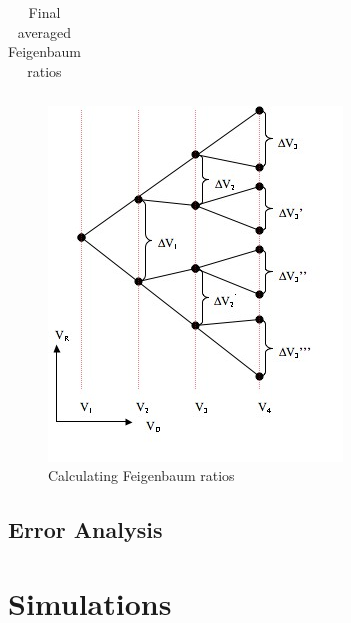 \documentclass[12pt]{report}
\begin{document}

	
	\begin{table}
		\centering
		\begin{tabular}{|c|c|c|c|c|}
			\hline
			 
		\end{tabular}
		\caption{Final averaged Feigenbaum ratios}
		\label{tab:fegeinbaum}
	\end{table}
	
	\begin{figure}
		\centering
		\includegraphics{Pics/Bifurcation Diagram.jpg}
		\caption{Calculating Feigenbaum ratios}
		\label{fig: Calculating Feigenbaum ratios}
	\end{figure}
	



\section{Error Analysis} %
\label{sec:Error Analysis}



\chapter{Simulations} %
\label{ch:Simulations}


\end{document}
